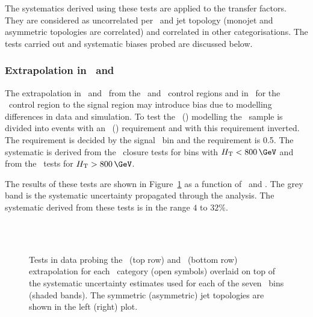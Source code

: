 The systematics derived using these tests are applied to the transfer factors. They are considered
as uncorrelated per \scalht~and jet topology (monojet and asymmetric topologies are correlated) and correlated in other categorisations. The tests carried 
out and systematic biases probed are discussed below.

\subsubsection{Extrapolation in \alphat~and \bdphi}

The extrapolation in \alphat~and \bdphi~from the \mj~and \mmj~control regions 
and in \bdphi~for the \gj~control region to the signal region may introduce bias
 due to modelling differences in data and simulation. To test the \alphat~(\bdphi) modelling the \mj~sample is divided 
into events with an \alphat~(\bdphi) requirement and with this requirement inverted.
The \alphat requirement is decided by the signal \scalht~bin 
and the \bdphi requirement is 0.5. The systematic is derived from the \alphat~closure tests for
bins with $\scalht < 800\,\GeV$ and from the \bdphi~tests for $\scalht > 800\,\GeV$.

The results of these tests are shown in Figure~\ref{fig:closureAlphaT} as a function of \scalht~and \njet. 
The grey band is the systematic uncertainty propagated through the analysis. 
The systematic derived from these tests is
in the range $4$ to $32\%$.

\begin{figure}[h!]
  \begin{center}
    ~~
    \\
    ~~

    \caption{Tests in data probing the \alphat~(top row) and \bdphi~(bottom row) extrapolation for each
      \njet~category (open symbols) overlaid on top of the systematic
      uncertainty estimates used for each of the seven \scalht~bins (shaded bands). 
      The symmetric (asymmetric) jet topologies are shown in the left (right) plot. 
    }
    \label{fig:closureAlphaT}
  \end{center} 
\end{figure}
